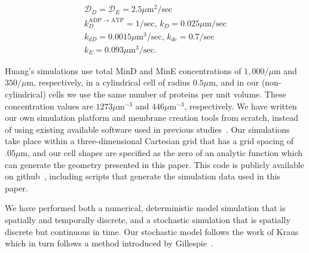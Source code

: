 \documentclass[10pt,letterpaper]{article}
\newcommand\micron{\ensuremath{\mu\text{m}}}
\begin{document}
\begin{gather*}
  \mathcal{D}_D = \mathcal{D}_{E} = 2.5\micron^2/\text{sec}\\
  k_D^{\textrm{ADP $\rightarrow$ ATP}} = 1/\textrm{sec,  }
  k_D = 0.025 \micron /\textrm{sec}\\
  k_{dD} = 0.0015 \micron^3/ \textrm{sec,  }
  k_{de} = 0.7/\textrm{sec}\\
  k_E = 0.093 \micron^3 /\textrm{sec}.
\end{gather*}

Huang's simulations use total MinD and MinE concentrations of
$1,000/\micron$ and $350/\micron$, respectively, in a cylindrical cell
of radius $0.5\micron$, and in our (non-cylindrical) cells we use the
same number of proteins per unit volume.  These concentration values
are $1273\micron^{-3}$ and $446\micron^{-3}$, respectively. We have
written our own simulation platform and membrane creation tools from
scratch, instead of using existing available software used in previous
studies~\cite{bonny2013membrane,fange2006noise,halatek2012highly,kerr2006division}.
Our simulations take place within a three-dimensional Cartesian grid
that has a grid spacing of .05\micron, and our cell shapes are
specified as the zero of an analytic function which can generate the
geometry presented in this paper.  This code is publicly available
on github~\cite{git}, including scripts that generate the simulation
data used in this paper.

We have performed both a numerical, deterministic model simulation
that is spatially and temporally discrete, and a stochastic simulation
that is spatially discrete but continuous in time.  Our stochastic
model follows the work of Kraus~\cite{kraus1996crosstalk} which in
turn follows a method introduced by
Gillespie~\cite{gillespie1977exact}.
\end{document}

